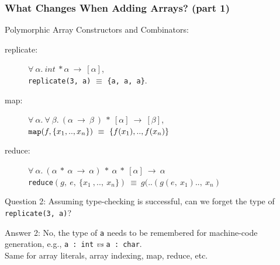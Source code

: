 \documentclass{beamer}
\renewcommand{\emph}[1]{\textcolor{structure}{#1}}
\newcommand{\emp}[1]{\textcolor{DikuRed}{ #1}}
\begin{document}
\begin{frame}[fragile,t]
   \frametitle{What Changes When Adding Arrays? (part 1)}

\bigskip

Polymorphic Array Constructors and Combinators:

\smallskip

\begin{description}
    \item[replicate:] $\forall~\alpha.~int~*\alpha~\rightarrow~[\alpha]$,\\
                        {\tt replicate(3, a)} $\equiv$ {\tt\{a, a, a\}}.\smallskip
    
    \item[map:] $\forall~\alpha.~\forall~\beta.~(\alpha~\rightarrow~\beta~)~*~[\alpha]~\rightarrow~[\beta]$,\\
                    ${\tt map}(f, \{x_1 ,..,x_n\})~\equiv~\{f(x_1 ),..,f(x_n)\}$\smallskip


    \item[reduce:] $\forall~\alpha.~(\alpha~*~\alpha~\rightarrow~\alpha)~*~\alpha~*~[\alpha]~\rightarrow~\alpha$\\
                        {\tt reduce}$(g,~e,~\{x_1~,..,~x_n\})~\equiv~g(..(g(e,~x_1 )..,~x_n)$

\end{description}

\bigskip

\emp{Question 2: Assuming type-checking is successful, can we forget the
type of {\tt replicate(3, a)}?}

\bigskip

\emph{Answer 2: No, the type of {\tt a} needs to be remembered for
    machine-code generation, e.g., {\tt a~:~int} {\em vs} {\tt a~:~char}.} \\

Same for array literals, array indexing, map, reduce, etc.
\end{frame}
\end{document}

